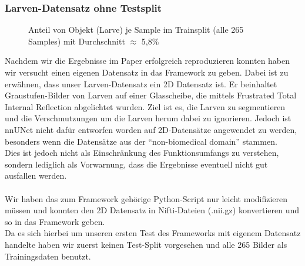 \subsubsection{Larven-Datensatz ohne Testsplit}
\begin{figure}[H]
\centering

\caption{Anteil von Objekt (Larve) je Sample im Trainsplit (alle 265 Samples) mit Durchschnitt $\approx$ 5,8\%}
\label{pic:Haeuf_200}
\end{figure}
Nachdem wir die Ergebnisse im Paper erfolgreich reproduzieren konnten haben wir versucht einen eigenen Datensatz in das Framework zu geben. Dabei ist zu erwähnen, dass unser Larven-Datensatz \cite{larven} ein 2D Datensatz ist. Er beinhaltet Graustufen-Bilder von Larven auf einer Glasscheibe, die mittels Frustrated Total Internal Reflection abgelichtet wurden. Ziel ist es, die Larven zu segmentieren und die Verschmutzungen um die Larven herum dabei zu ignorieren. Jedoch ist nnUNet nicht dafür entworfen worden auf 2D-Datensätze angewendet zu werden, besonders wenn die Datensätze aus der \enquote{non-biomedical domain} \cite{nnunetGithub2D-Daten} stammen.\\
Dies ist jedoch nicht als Einschränkung des Funktionsumfangs zu verstehen, sondern lediglich als Vorwarnung, dass die Ergebnisse eventuell nicht gut ausfallen werden.\\\\
Wir haben das zum Framework gehörige Python-Script \cite{nnunetGithub2D-Pythonscript} nur leicht modifizieren müssen und konnten den 2D Datensatz in Nifti-Dateien (.nii.gz) konvertieren und so in das Framework geben.\\
Da es sich hierbei um unseren ersten Test des Frameworks mit eigenem Datensatz handelte haben wir zuerst keinen Test-Split vorgesehen und alle 265 Bilder als Trainingsdaten benutzt.
